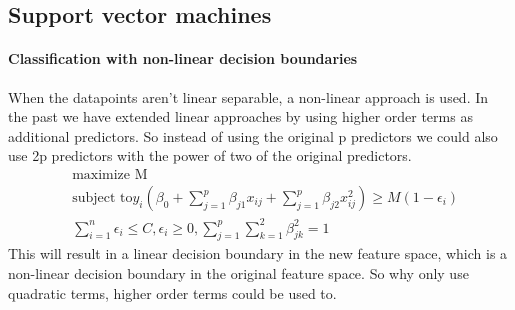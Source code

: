 \documentclass[../document.tex]{subfiles}
\begin{document}
	\subsection{Support vector machines}
	\paragraph{Classification with non-linear decision boundaries}
	When the datapoints aren't linear separable, a non-linear approach is used. In the past we have extended linear approaches by using higher order terms as additional predictors. So instead of using the original p predictors we could also use 2p predictors with the power of two of the original predictors.
	\begin{equation}
	\begin{split}
		&\text{maximize M}\\
		&\text{subject to} y_{i}(\beta_{0}+\sum_{j=1}^{p}\beta_{j1}x_{ij}+\sum_{j=1}^{p}\beta_{j2}x_{ij}^2)\ge M(1-\epsilon_{i})\\
		&\sum_{i=1}^{n}\epsilon_{i}\le C, \epsilon_{i}\ge 0, \sum_{j=1}^{p}\sum_{k=1}^{2}\beta_{jk}^2=1
	\end{split}
	\end{equation}
	This will result in a linear decision boundary in the new feature space, which is a non-linear decision boundary in the original feature space. So why only use quadratic terms, higher order terms could be used to.
\end{document}
